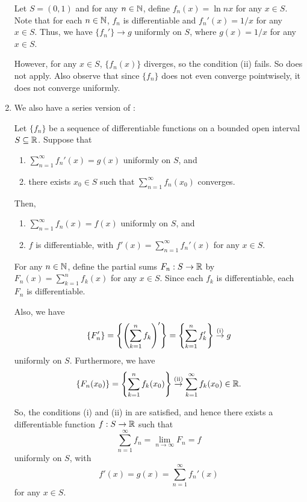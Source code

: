 \begin{enumerate}
Let \(S=(0,1)\) and for any \(n\in\mathbb{N}\), define \(f_n(x)=\ln nx\) for any \(x\in
S\).  Note that for each \(n\in\mathbb{N}\), \(f_n\) is differentiable and
\(f_n'(x)=1/x\) for any \(x\in S\). Thus, we have \(\{f_n'\}\to g\) uniformly
on \(S\), where \(g(x)=1/x\) for any \(x\in S\).

However, for any \(x\in S\), \(\{f_n(x)\}\) diverges, so the condition (ii)
fails. So   does not apply. Also observe that
since \(\{f_n\}\) does not even converge pointwisely, it does not
converge uniformly.

\item We also have a series version of :

\begin{corollary}
\label{cor:series-unif-conv-lim-diff-comm}
Let \(\{f_n\}\) be a sequence of differentiable functions on a bounded open
interval \(S\subseteq \mathbb{R}\). Suppose that
\begin{enumerate}[label={(\roman*)}]
\item \(\sum_{n=1}^{\infty}f_n'(x)=g(x)\) uniformly on \(S\), and
\item there exists \(x_0\in S\) such that \(\sum_{n=1}^{\infty}f_n(x_0)\)
converges.
\end{enumerate}
Then,
\begin{enumerate}
\item \(\sum_{n=1}^{\infty}f_n(x)=f(x)\) uniformly on \(S\), and
\item \(f\) is differentiable, with \(f'(x)=\sum_{n=1}^{\infty}f_n'(x)\) for any \(x\in S\).
\end{enumerate}
\end{corollary}
\begin{pf}
For any \(n\in\mathbb{N}\), define the partial sums \(F_n:S\to\mathbb{R}\) by
\(F_n(x)=\sum_{k=1}^{n}f_k(x)\) for any \(x\in S\). Since each \(f_k\) is
differentiable, each \(F_n\) is differentiable.

Also, we have
\[
\{F_n'\}=\qty{\qty(\sum_{k=1}^{n}f_k)'}
=\qty{\sum_{k=1}^{n}f_k'}
\overset{\text{(i)}}{\to}g
\]
uniformly on \(S\). Furthermore, we have
\[
\{F_n(x_0)\}=\qty{\sum_{k=1}^{n}f_k(x_0)}
\overset{\text{(ii)}}{\to}\sum_{k=1}^{\infty}f_k(x_0)\in\mathbb{R}.
\]

So, the conditions (i) and (ii) in  are
satisfied, and hence there exists a differentiable function \(f:S\to\mathbb{R}\) such that
\[
\sum_{n=1}^{\infty}f_n=\lim_{n\to \infty}F_n=f
\]
uniformly on \(S\), with
\[
f'(x)=g(x)=\sum_{n=1}^{\infty}f_n'(x)
\]
for any \(x\in S\).
\end{pf}
\end{enumerate}
